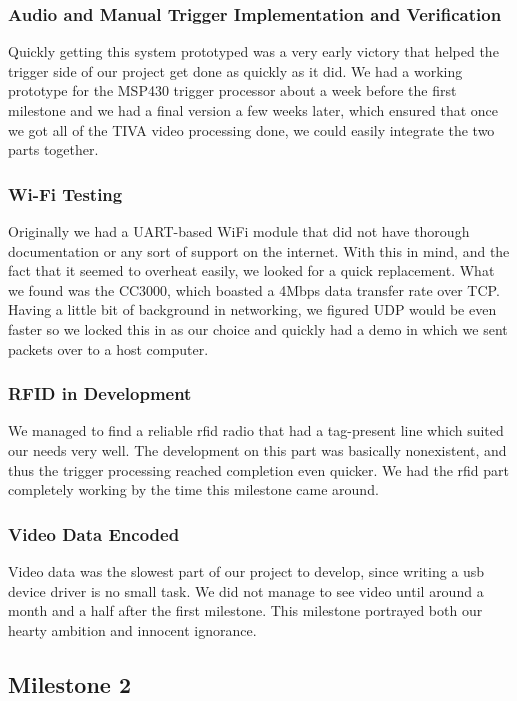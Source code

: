 \documentclass[12pt]{article}
\begin{document}
\subsubsection{Audio and Manual Trigger Implementation and Verification}
Quickly getting this system prototyped was a very early victory that helped the
trigger side of our project get done as quickly as it did. We had a working
prototype for the MSP430 trigger processor about a week before the first
milestone and we had a final version a few weeks later, which ensured that once
we got all of the TIVA video processing done, we could easily integrate the two
parts together.

\subsubsection{Wi-Fi Testing}
Originally we had a UART-based WiFi module that did not have thorough
documentation or any sort of support on the internet. With this in mind, and
the fact that it seemed to overheat easily, we looked for a quick replacement.
What we found was the CC3000, which boasted a 4Mbps data transfer rate over
TCP.  Having a little bit of background in networking, we figured UDP would be
even faster so we locked this in as our choice and quickly had a demo in which
we sent packets over to a host computer.

\subsubsection{RFID in Development}
We managed to find a reliable \gls{rfid} radio that had a tag-present line
which suited our needs very well. The development on this part was basically
nonexistent, and thus the trigger processing reached completion even quicker.
We had the \gls{rfid} part completely working by the time this milestone came
around.

\subsubsection{Video Data Encoded}
Video data was the slowest part of our project to develop, since writing a
\gls{usb} device driver is no small task. We did not manage to see video until
around a month and a half after the first milestone. This milestone portrayed
both our hearty ambition and innocent ignorance.

\subsection{Milestone 2}
\end{document}
